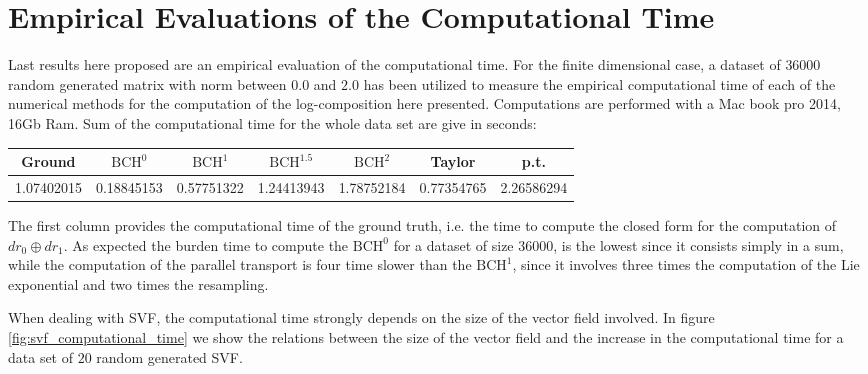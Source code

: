 \section{Empirical Evaluations of the Computational Time}

Last results here proposed are an empirical evaluation of the computational time. 
For the finite dimensional case, a dataset of $36000$ random generated matrix with norm between $0.0$ and $2.0$ has been utilized to measure the empirical computational time of each of the numerical methods for the computation of the log-composition here presented. Computations are performed with a Mac book pro 2014, 16Gb Ram. Sum of the computational time for the whole data set are give in seconds:\\

\hspace{-1cm}
\begin{tabular}{ c | c | c | c | c | c | c }
Ground & $\text{BCH}^0$ & $\text{BCH}^1$ & $\text{BCH}^{1.5}$ & $\text{BCH}^2$ & Taylor & p.t. \\
\hline
1.07402015 & 0.18845153 & 0.57751322 & 1.24413943 & 1.78752184 & 0.77354765 &
2.26586294 
\end{tabular}
\vspace{0.5cm}

The first column provides the computational time of the ground truth, i.e. the time to compute the closed form for the computation of $dr_0 \oplus dr_{1}$. As expected the burden time to compute the $\text{BCH}^0$ for a dataset of size $36000$, is the lowest since it consists simply in a sum, while the computation of the parallel transport is four time slower than the $\text{BCH}^1$, since it involves three times the computation of the Lie exponential and two times the resampling.

When dealing with SVF, the computational time strongly depends on the size of the vector field involved. In figure \ref{fig:svf_computational_time} we show the relations between the size of the vector field and the increase in the computational time for a data set of $20$ random generated SVF.








